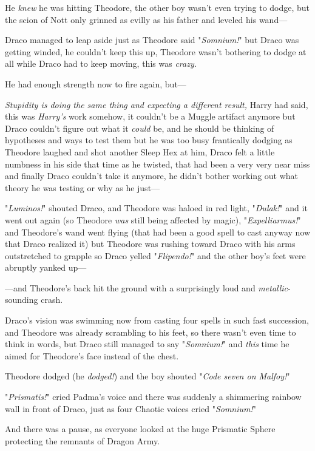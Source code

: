 He \emph{knew} he was hitting Theodore, the other boy wasn't even trying to
dodge, but the scion of Nott only grinned as evilly as his father and leveled
his wand—

Draco managed to leap aside just as Theodore said "\emph{Somnium!}" but Draco
was getting winded, he couldn't keep this up, Theodore wasn't bothering to
dodge at all while Draco had to keep moving, this was \emph{crazy.}

He had enough strength now to fire again, but—

\emph{Stupidity is doing the same thing and expecting a different result,}
Harry had said, this was \emph{Harry's} work somehow, it couldn't be a Muggle
artifact anymore but Draco couldn't figure out what it \emph{could} be, and he
should be thinking of hypotheses and ways to test them but he was too busy
frantically dodging as Theodore laughed and shot another Sleep Hex at him,
Draco felt a little numbness in his side that time as he twisted, that had been
a very very near miss and finally Draco couldn't take it anymore, he didn't
bother working out what theory he was testing or why as he just—

"\emph{Luminos!}" shouted Draco, and Theodore was haloed in red light,
"\emph{Dulak!}" and it went out again (so Theodore \emph{was} still being
affected by magic), "\emph{Expelliarmus!}" and Theodore's wand went flying
(that had been a good spell to cast anyway now that Draco realized it) but
Theodore was rushing toward Draco with his arms outstretched to grapple so
Draco yelled "\emph{Flipendo!}" and the other boy's feet were abruptly yanked
up—

—and Theodore's back hit the ground with a surprisingly loud and
\emph{metallic}-sounding crash.

Draco's vision was swimming now from casting four spells in such fast
succession, and Theodore was already scrambling to his feet, so there wasn't
even time to think in words, but Draco still managed to say "\emph{Somnium!}"
and \emph{this} time he aimed for Theodore's face instead of the chest.

Theodore dodged (he \emph{dodged!}) and the boy shouted "\emph{Code seven on
Malfoy!}"

"\emph{Prismatis!}" cried Padma's voice and there was suddenly a shimmering
rainbow wall in front of Draco, just as four Chaotic voices cried
"\emph{Somnium!}"

And there was a pause, as everyone looked at the huge Prismatic Sphere
protecting the remnants of Dragon Army.

